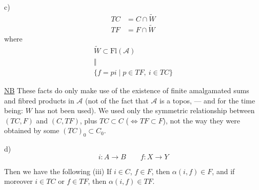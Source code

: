 c) 
\[
\begin{aligned}
TC&=C\cap\widetilde W\\
TF&=F\cap\widetilde W
\end{aligned}
\]
where
\[
\begin{gathered}
\widetilde W\subset\mathrm{Fl}(\mathcal A)\\
\Vert\\
\{f=pi\mid p\in TF,\ i\in TC\}
\end{gathered}
\]

\uline{NB} These facts do only make use of the existence of finite amalgamated sums and fibred products in $\mathcal A$ (not of the fact that $\mathcal A$ is a topos, --- and for the time being: $W$ has not been used).
We used only the symmetric relationship between  $(TC,F)$ and $(C,TF)$,  plus $TC\subset C$ ($\Leftrightarrow TF\subset F$), not the way they were obtained by some  $(TC)_0\subset C_0$.

d)  
\[
i\colon A\to B\qquad f\colon X\to Y
\]
\qquad{}


Then we have the following 
(iii) If $i\in C$, $f\in F$, then $\alpha(i,f)\in F$, and if moreover $i\in TC$ or $f\in TF$, then $\alpha(i,f)\in TF$.

